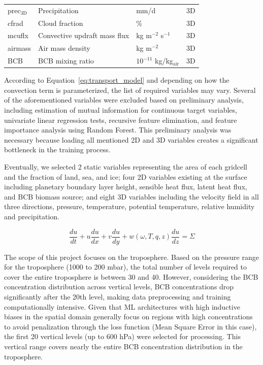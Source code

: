 \documentclass{article}
\begin{document}
\begin{table}[htbp]
\begin{tabular}{llll}
            prec$_{\text{3D}}$  & Precipitation                     & mm/d                               & 3D  \\
            cfrad               & Cloud fraction                    & \%                                 & 3D  \\
            mcuflx              & Convective updraft mass flux      & kg m$^{-2}$ s$^{-1}$               & 3D  \\
            airmass             & Air mass density                  & kg m$^{-2}$                        & 3D  \\
            BCB                 & BCB mixing ratio                  & $10^{-11}$ kg/kg$_{\text{air}}$    & 3D  \\ \hline
        \end{tabular}
    \end{table}
    
    According to Equation~\ref{eq:transport_model} and depending on how the convection term is parameterized, the list of required variables may vary. Several of the aforementioned variables were excluded based on preliminary analysis, including estimation of mutual information for continuous target variables, univariate linear regression tests, recursive feature elimination, and feature importance analysis using Random Forest. This preliminary analysis was necessary because loading all mentioned 2D and 3D variables creates a significant bottleneck in the training process.
    
    Eventually, we selected 2 static variables representing the area of each gridcell and the fraction of land, sea, and ice; four 2D variables existing at the surface including planetary boundary layer height, sensible heat flux, latent heat flux, and BCB biomass source; and eight 3D variables including the velocity field in all three directions, pressure, temperature, potential temperature, relative humidity and precipitation.
    
    \begin{equation}
        \frac{du}{dt} + u\frac{du}{dx} + v\frac{du}{dy} + w(\omega,T,q,z)\frac{du}{dz} = \Sigma
        \label{eq:transport_model}
    \end{equation}
    
    The scope of this project focuses on the troposphere. Based on the pressure range for the troposphere (1000 to 200 mbar), the total number of levels required to cover the entire troposphere is between 30 and 40. However, considering the BCB concentration distribution across vertical levels, BCB concentrations drop significantly after the 20th level, making data preprocessing and training computationally intensive. Given that ML architectures with high inductive biases in the spatial domain generally focus on regions with high concentrations to avoid penalization through the loss function (Mean Square Error in this case), the first 20 vertical levels (up to 600 hPa) were selected for processing. This vertical range covers nearly the entire BCB concentration distribution in the troposphere.
\end{document}
